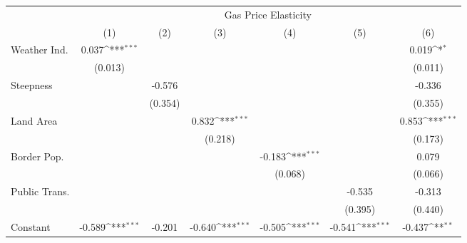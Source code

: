 {
\def\sym#1{\ifmmode^{#1}\else\(^{#1}\)\fi}
\begin{tabular}{l*{6}{c}}
\hline\hline
            &\multicolumn{6}{c}{Gas Price Elasticity}                                                                                           \\
            &\multicolumn{1}{c}{(1)}         &\multicolumn{1}{c}{(2)}         &\multicolumn{1}{c}{(3)}         &\multicolumn{1}{c}{(4)}         &\multicolumn{1}{c}{(5)}         &\multicolumn{1}{c}{(6)}         \\
\hline
Weather Ind.&       0.037\sym{***}&                     &                     &                     &                     &       0.019\sym{*}  \\
            &     (0.013)         &                     &                     &                     &                     &     (0.011)         \\
[1em]
Steepness   &                     &      -0.576         &                     &                     &                     &      -0.336         \\
            &                     &     (0.354)         &                     &                     &                     &     (0.355)         \\
[1em]
Land Area   &                     &                     &       0.832\sym{***}&                     &                     &       0.853\sym{***}\\
            &                     &                     &     (0.218)         &                     &                     &     (0.173)         \\
[1em]
Border Pop. &                     &                     &                     &      -0.183\sym{***}&                     &       0.079         \\
            &                     &                     &                     &     (0.068)         &                     &     (0.066)         \\
[1em]
Public Trans.&                     &                     &                     &                     &      -0.535         &      -0.313         \\
            &                     &                     &                     &                     &     (0.395)         &     (0.440)         \\
[1em]
Constant    &      -0.589\sym{***}&      -0.201         &      -0.640\sym{***}&      -0.505\sym{***}&      -0.541\sym{***}&      -0.437\sym{**} \\

\end{tabular}}
